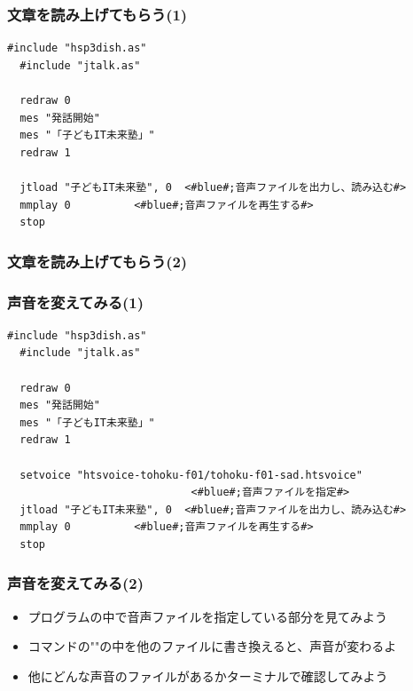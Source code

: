 \documentclass[14pt]{beamer}
\begin{document}
\begin{frame}[fragile]
  \frametitle{文章を読み上げてもらう(1)}
  
  \begin{lstlisting}[title=openjtalk.hsp,label=openjtalk.hsp]
  #include "hsp3dish.as"
  #include "jtalk.as"

  redraw 0
  mes "発話開始"
  mes "「子どもIT未来塾」"
  redraw 1
  
  jtload "子どもIT未来塾", 0	<#blue#;音声ファイルを出力し、読み込む#>
  mmplay 0			<#blue#;音声ファイルを再生する#>
  stop
  \end{lstlisting}
\end{frame}

\begin{frame}
  \frametitle{文章を読み上げてもらう(2)}
\end{frame}

\begin{frame}[fragile]
  \frametitle{声音を変えてみる(1)}
  
  \begin{lstlisting}[title=openjtalk.hsp,label=openjtalk.hsp]
  #include "hsp3dish.as"
  #include "jtalk.as"

  redraw 0
  mes "発話開始"
  mes "「子どもIT未来塾」"
  redraw 1
 
  setvoice "htsvoice-tohoku-f01/tohoku-f01-sad.htsvoice" 
                             <#blue#;音声ファイルを指定#>
  jtload "子どもIT未来塾", 0	<#blue#;音声ファイルを出力し、読み込む#>
  mmplay 0			<#blue#;音声ファイルを再生する#>
  stop
  \end{lstlisting}
\end{frame}

\begin{frame}
 \frametitle{声音を変えてみる(2)}
  \begin{itemize}
    \item プログラムの中で音声ファイルを指定している部分を見てみよう
    \item コマンドの""の中を他のファイルに書き換えると、声音が変わるよ
    \item 他にどんな声音のファイルがあるかターミナルで確認してみよう
  \end{itemize}
\end{frame}
\end{document}
